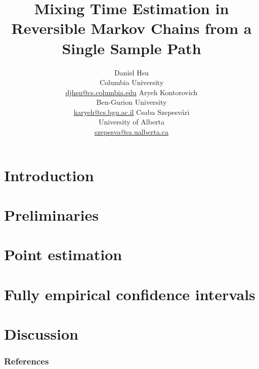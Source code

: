 \documentclass{article}
\title{%
  Mixing Time Estimation in Reversible Markov Chains from a Single
  Sample Path%
}
\author{%
  Daniel Hsu \\
  Columbia University \\
  \url{djhsu@cs.columbia.edu}
  \And
  Aryeh Kontorovich \\
  Ben-Gurion University \\
  \url{karyeh@cs.bgu.ac.il}
  \And
  Csaba Szepesv\'ari \\
  University of Alberta \\
  \url{szepesva@cs.ualberta.ca}
}
\begin{document}
\begin{bibunit}[myunsrt]
  \maketitle

  \begin{abstract} 
  
  \end{abstract} 

  \section{Introduction}\label{sec:intro}
  

  \section{Preliminaries}\label{sec:prelim}
  

  \section{Point estimation}\label{sec:rates}
  

  \section{Fully empirical confidence intervals}\label{sec:empirical}
  

  \section{Discussion}\label{sec:discussion}
  

  \subsubsection*{References}
  {\def\section*#1{}\small\putbib[all]}
\end{bibunit}

\appendix
\end{document}
